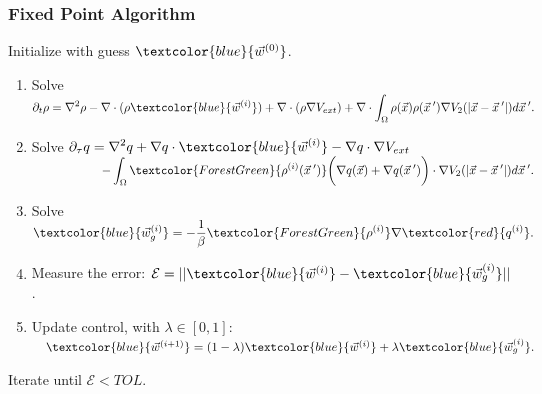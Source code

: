\documentclass[aspectratio=169,xcolor=dvipsnames]{beamer}
\begin{document}
\begin{frame}
	\frametitle{Fixed Point Algorithm}

Initialize with guess $\textcolor{blue}{\vec{w}^{(0)}}$.
	\begin{enumerate}
     \item 
     Solve $\displaystyle \partial_t \rho  = \nabla^2 \rho  - \nabla \cdot (\rho \textcolor{blue}{\vec{w}^{(i)}} ) + \nabla \cdot \left(\rho \nabla V_{ext}\right)
     + \nabla \cdot \int_\Omega \rho(\vec{x}) \rho(\vec{x}\hspace{0.2em}') \nabla V_2(|\vec{x}-\vec{x}\hspace{0.2em}'|)d\vec{x}\hspace{0.2em}'. 
     $
	 \item
     Solve $\displaystyle \partial_{{\tau}} q  = \nabla^2 q  + \nabla q  \cdot \textcolor{blue}{\vec{w}^{(i)}}  - \nabla q \cdot \nabla V_{ext}$\\
     $\qquad \qquad \quad \ \ \displaystyle - \int_\Omega \textcolor{ForestGreen}{\rho^{(i)}(\vec{x}\hspace{0.2em}')} \bigg(\nabla q( \vec{x} ) + \nabla q( \vec{x}\hspace{0.2em}')\bigg) \cdot \nabla V_2(|\vec{x}-\vec{x}\hspace{0.2em}'|)d\vec{x}\hspace{0.2em}'. 
     $
     \item Solve $\displaystyle \textcolor{blue}{\vec{w}^{(i)}_g} = - \frac{1}{\beta}\textcolor{ForestGreen}{{\rho}^{(i)}} \nabla \textcolor{red}{{q}^{(i)}}.$
     \vspace{0.4 cm}
     \item Measure the error: $ \mathcal{E} = ||\textcolor{blue}{\vec{w}^{(i)}} - \textcolor{blue}{\vec{w}^{(i)}_g}||$.
     \vspace{0.2 cm}
	 \item Update control, with $\lambda \in [0,1]$:       $\quad \textcolor{blue}{\vec{w}^{(i+1)}} = (1-\lambda)\textcolor{blue}{\vec{w}^{(i)}} + \lambda \textcolor{blue}{\vec{w}^{(i)}_g}.$	 
	\end{enumerate}	
\vspace{0.2 cm}
Iterate until $\mathcal{E} <TOL$.
\end{frame}
\end{document}
